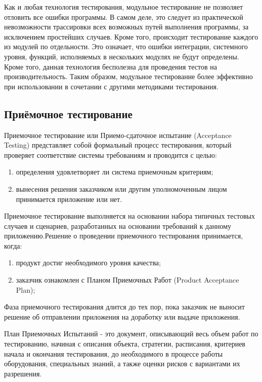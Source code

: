 Как и любая технология тестирования, модульное тестирование не позволяет отловить все ошибки программы. В самом деле,
это следует из практической невозможности трассировки всех возможных путей выполнения программы, за исключением
простейших случаев. Кроме того, происходит тестирование каждого из модулей по отдельности. Это означает, что ошибки
интеграции, системного уровня, функций, исполняемых в нескольких модулях не будут определены. Кроме того, данная
технология бесполезна для проведения тестов на производительность. Таким образом, модульное тестирование более
эффективно при использовании в сочетании с другими методиками тестирования.

\subsection{Приёмочное тестирование}

Приемочное тестирование или Приемо-сдаточное испытание (Acceptance Testing) представляет собой формальный процесс
тестирования, который проверяет соответствие системы требованиям и проводится с целью:

\begin{enumerate}
\item определения удовлетворяет ли система приемочным критериям;
\item вынесения решения заказчиком или другим уполномоченным лицом принимается приложение или нет.
\end{enumerate}

Приемочное тестирование выполняется на основании набора типичных тестовых случаев и сценариев, разработанных на
основании требований к данному приложению.Решение о проведении приемочного тестирования принимается, когда:

\begin{enumerate}
\item продукт достиг необходимого уровня качества;
\item заказчик ознакомлен с Планом Приемочных Работ (Product Acceptance Plan);
\end{enumerate}

Фаза приемочного тестирования длится до тех пор, пока заказчик не выносит решение об отправлении приложения на
доработку или выдаче приложения.

План Приемочных Испытаний -  это документ, описывающий весь объем работ по тестированию, начиная с описания объекта,
стратегии, расписания, критериев начала и окончания тестирования, до необходимого в процессе работы оборудования,
специальных знаний, а также оценки рисков с вариантами их разрешения.

